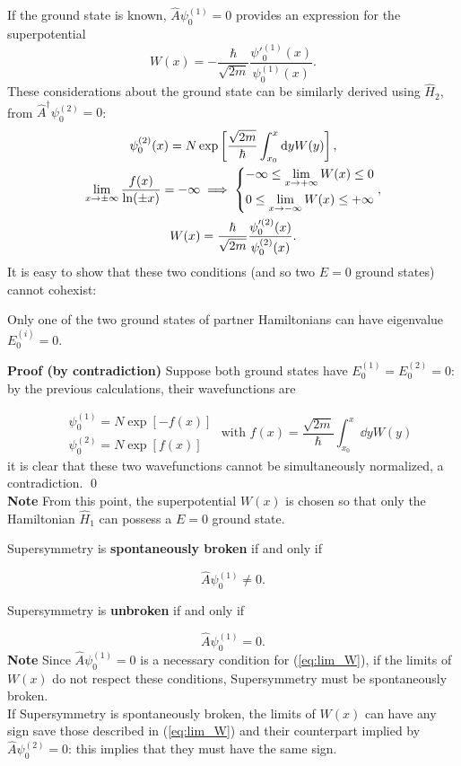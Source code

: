 If the ground state is known, $\hat A \psi^{(1)}_0=0$ provides an expression for
the superpotential
\begin{equation}
W(x)=-\frac{\hbar}{\sqrt{2m}}\frac{\psi'^{(1)}_0(x)}{\psi^{(1)}_0(x)}.
\label{eq:W_ground}
\end{equation}
These considerations about the ground state can be similarly derived using $\hat H_2$, from
$\hat A^\dagger \psi^{(2)}_0=0$:
\begin{gather*}
\psi^{(2)}_0(x)=N\exp\left[\frac{\sqrt{2m}}{\hbar}\int_{x_0}^{x}\dd y W(y)\right],\\
\lim\limits_{x\to\pm\infty}\frac{f(x)}{\ln(\pm x)}=-\infty\implies\begin{dcases*}
-\infty\leq\lim\limits_{x\to+\infty}W(x)\leq0\\
0\leq\lim\limits_{x\to-\infty}W(x)\leq+\infty
\end{dcases*},\\
W(x)=\frac{\hbar}{\sqrt{2m}}\frac{\psi'^{(2)}_0(x)}{\psi^{(2)}_0(x)}.
\end{gather*}
It is easy to show that these two conditions (and so two $E=0$ ground states) cannot cohexist:
\begin{thm}
Only one of the two ground states of partner Hamiltonians can have eigenvalue $E^{(i)}_0=0$.
\end{thm}

\textbf{Proof (by contradiction)} Suppose both ground states have
$E^{(1)}_0 = E^{(2)}_0=0$: by the previous calculations, their wavefunctions are

$$\begin{aligned}
&\psi^{(1)}_0 = N\exp\left[-f(x)\right]\\
&\psi^{(2)}_0 = N\exp\left[f(x)\right]
\end{aligned}\text{  with } f(x)=\frac{\sqrt{2m}}{\hbar}\int_{x_0}^{x}\dd y W(y)
$$
it is clear that these two wavefunctions cannot be simultaneously normalized, a contradiction.
\qed\\

\textbf{Note} From this point, the superpotential $W(x)$ is chosen so that only the
Hamiltonian $\hat H_1$ can possess a $E=0$ ground state.
\newpage
\begin{defn}
Supersymmetry is \textbf{spontaneously broken} if and only if
\label{def:broken_susy}
\end{defn}
$$\hat A \psi^{(1)}_0 \neq0.$$
\begin{defn}
Supersymmetry is \textbf{unbroken} if and only if
\label{def:unbroken_susy}
\end{defn}
$$\hat A \psi^{(1)}_0=0.$$
\textbf{Note}
Since $\hat A\psi^{(1)}_0=0$ is a necessary condition for
(\ref{eq:lim_W}), if the limits of $W(x)$ do not respect these conditions,
Supersymmetry must be spontaneously broken.\\
If Supersymmetry is spontaneously broken, the limits of $W(x)$ can
have any sign save those described in (\ref{eq:lim_W}) and their counterpart
implied by $\hat A \psi^{(2)}_0=0$: this implies that they must have the same
sign.


